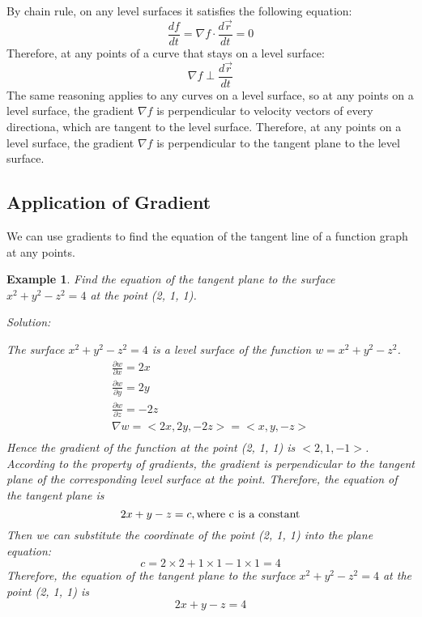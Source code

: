 \documentclass{article}
\newtheorem{example}{Example}
\begin{document}
By chain rule, on any level surfaces it satisfies the following equation:
\begin{equation*}
  \frac{df}{dt} = \nabla f \cdot \frac{d\vec{r}}{dt} = 0
\end{equation*}
Therefore, at any points of a curve that stays on a level surface:
\begin{equation*}
  \nabla f \perp \frac{d\vec{r}}{dt}
\end{equation*}
The same reasoning applies to any curves on a level surface, so at any points on 
a level surface, the gradient $\nabla f$ is perpendicular to velocity vectors of 
every directiona, which are tangent to the level surface. Therefore, at any 
points on a level surface, the gradient $\nabla f$ is perpendicular to the 
tangent plane to the level surface.

\subsection{Application of Gradient}

We can use gradients to find the equation of the tangent line of a function 
graph at any points.

\begin{example}
  Find the equation of the tangent plane to the surface $x^2 + y^2 - z^2 = 4$ at 
  the point (2, 1, 1).

  Solution:

  The surface $x^2 + y^2 - z^2 = 4$ is a level surface of the function 
  $w = x^2 + y^2 - z^2$.
  \begin{gather*}
    \frac{\partial w}{\partial x} = 2x \\
    \frac{\partial w}{\partial y} = 2y \\
    \frac{\partial w}{\partial z} = -2z \\
    \nabla w = <2x, 2y, -2z> = <x, y, -z> \\
  \end{gather*}
  Hence the gradient of the function at the point (2, 1, 1) is $<2, 1, -1>$. 
  According to the property of gradients, the gradient is perpendicular to the 
  tangent plane of the corresponding level surface at the point. Therefore, the 
  equation of the tangent plane is 
  \[ 2x + y - z = c, \textnormal{where c is a constant} \]
  Then we can substitute the coordinate of the point (2, 1, 1) into the plane 
  equation:
  \[ c = 2 \times 2 + 1 \times 1 - 1 \times 1 = 4 \]
  Therefore, the equation of the tangent plane to the surface 
  $x^2 + y^2 - z^2 = 4$ at the point (2, 1, 1) is
  \[ 2x + y - z = 4 \]
\end{example}
\end{document}
